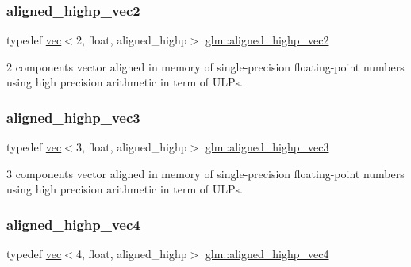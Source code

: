 \subsubsection{\texorpdfstring{aligned\+\_\+highp\+\_\+vec2}{aligned\_highp\_vec2}}
{\footnotesize\ttfamily typedef \hyperlink{structglm_1_1vec}{vec}$<$2, float, aligned\+\_\+highp$>$ \hyperlink{group__gtc__type__aligned_ga7467c1a16f31911de3b927338434af6d}{glm\+::aligned\+\_\+highp\+\_\+vec2}}



2 components vector aligned in memory of single-\/precision floating-\/point numbers using high precision arithmetic in term of U\+L\+Ps. 

\mbox{\label{group__gtc__type__aligned_ga9ddb18aa4936b5aa354fcefe179675af}} 
\subsubsection{\texorpdfstring{aligned\+\_\+highp\+\_\+vec3}{aligned\_highp\_vec3}}
{\footnotesize\ttfamily typedef \hyperlink{structglm_1_1vec}{vec}$<$3, float, aligned\+\_\+highp$>$ \hyperlink{group__gtc__type__aligned_ga9ddb18aa4936b5aa354fcefe179675af}{glm\+::aligned\+\_\+highp\+\_\+vec3}}



3 components vector aligned in memory of single-\/precision floating-\/point numbers using high precision arithmetic in term of U\+L\+Ps. 

\mbox{\label{group__gtc__type__aligned_ga60d6561b0daa150c617f3a7a277e44ee}} 
\subsubsection{\texorpdfstring{aligned\+\_\+highp\+\_\+vec4}{aligned\_highp\_vec4}}
{\footnotesize\ttfamily typedef \hyperlink{structglm_1_1vec}{vec}$<$4, float, aligned\+\_\+highp$>$ \hyperlink{group__gtc__type__aligned_ga60d6561b0daa150c617f3a7a277e44ee}{glm\+::aligned\+\_\+highp\+\_\+vec4}}



